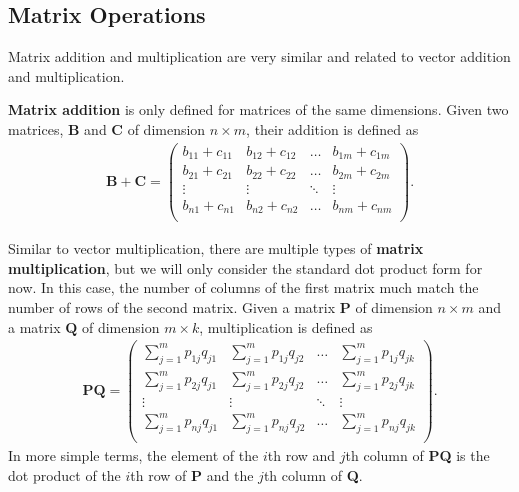 \documentclass[11pt]{article} %
\begin{document}
\subsection{Matrix Operations}
Matrix addition and multiplication are very similar and related to vector addition and multiplication.

\textbf{Matrix addition} is only defined for matrices of the same dimensions. Given two matrices, $\mathbf{B}$ and $\mathbf{C}$ of dimension $n \times m$, their addition is defined as
\begin{align}
    \textbf{B}+\textbf{C}=
    \begin{pmatrix}
        b_{11}+c_{11} & b_{12}+c_{12} & \hdots & b_{1m}+c_{1m} \\
        b_{21}+c_{21} & b_{22}+c_{22} & \hdots & b_{2m}+c_{2m} \\
        \vdots & \vdots & \ddots & \vdots \\
        b_{n1}+c_{n1} & b_{n2}+c_{n2} & \hdots & b_{nm}+c_{nm} \\
    \end{pmatrix}.
    \nonumber
\end{align}

Similar to vector multiplication, there are multiple types of \textbf{matrix multiplication}, but we will only consider the standard dot product form for now. In this case, the number of columns of the first matrix much match the number of rows of the second matrix. Given a matrix $\mathbf{P}$ of dimension $n \times m$ and a matrix $\mathbf{Q}$ of dimension $m \times k$, multiplication is defined as 
\begin{align}
    \textbf{P}\textbf{Q}=
    \begin{pmatrix}
        \sum_{j=1}^{m}p_{1j} q_{j1} & \sum_{j=1}^{m}p_{1j} q_{j2} & \hdots & \sum_{j=1}^{m}p_{1j} q_{jk} \\
        \sum_{j=1}^{m}p_{2j} q_{j1} & \sum_{j=1}^{m}p_{2j} q_{j2} & \hdots & \sum_{j=1}^{m}p_{2j} q_{jk} \\
        \vdots & \vdots & \ddots & \vdots \\
        \sum_{j=1}^{m}p_{nj} q_{j1} & \sum_{j=1}^{m}p_{nj} q_{j2} & \hdots & \sum_{j=1}^{m}p_{nj} q_{jk} \\
    \end{pmatrix}.
    \nonumber
\end{align}
In more simple terms, the element of the $i$th row and $j$th column of \textbf{PQ} is the dot product of the $i$th row of \textbf{P} and the $j$th column of \textbf{Q}.
\end{document}

